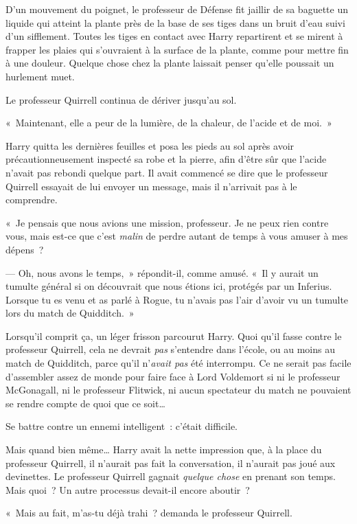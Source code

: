 D'un mouvement du poignet, le professeur de Défense fit jaillir de sa baguette un liquide qui atteint la plante près de la base de ses tiges dans un bruit d'eau suivi d'un sifflement.
Toutes les tiges en contact avec Harry repartirent et se mirent à frapper les plaies qui s'ouvraient à la surface de la plante, comme pour mettre fin à une douleur.
Quelque chose chez la plante laissait penser qu'elle poussait un hurlement muet.

Le professeur Quirrell continua de dériver jusqu'au sol.

«~Maintenant, elle a peur de la lumière, de la chaleur, de l'acide et de moi.~»

Harry quitta les dernières feuilles et posa les pieds au sol après avoir précautionneusement inspecté sa robe et la pierre, afin d'être sûr que l'acide n'avait pas rebondi quelque part.
Il avait commencé se dire que le professeur Quirrell essayait de lui envoyer un message, mais il n'arrivait pas à le comprendre.

«~Je pensais que nous avions une mission, professeur.
Je ne peux rien contre vous, mais est-ce que c'est \emph{malin} de perdre autant de temps à vous amuser à mes dépens~?

--- Oh, nous avons le temps,~» répondit-il, comme amusé.
«~Il y aurait un tumulte général si on découvrait que nous étions ici, protégés par un Inferius.
Lorsque tu es venu et as parlé à Rogue, tu n'avais pas l'air d'avoir vu un tumulte lors du match de Quidditch.~»

Lorsqu'il comprit ça, un léger frisson parcourut Harry.
Quoi qu'il fasse contre le professeur Quirrell, cela ne devrait \emph{pas} s'entendre dans l'école, ou au moins au match de Quidditch, parce qu'il n'\emph{avait pas} été interrompu.
Ce ne serait pas facile d'assembler assez de monde pour faire face à Lord Voldemort si ni le professeur McGonagall, ni le professeur Flitwick, ni aucun spectateur du match ne pouvaient se rendre compte de quoi que ce soit…

Se battre contre un ennemi intelligent~: c'était difficile.

Mais quand bien même…
Harry avait la nette impression que, à la place du professeur Quirrell, il n'aurait pas fait la conversation, il n'aurait pas joué aux devinettes.
Le professeur Quirrell gagnait \emph{quelque chose} en prenant son temps.
Mais quoi~?
Un autre processus devait-il encore aboutir~?

«~Mais au fait, m'as-tu déjà trahi~? demanda le professeur Quirrell.

